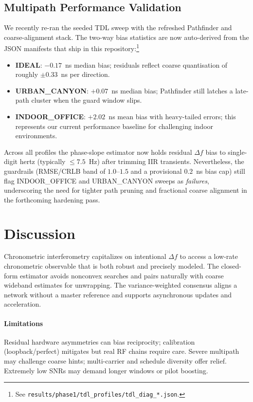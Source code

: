 \documentclass[10pt]{article}
\begin{document}
\subsection{Multipath Performance Validation}
We recently re-ran the seeded TDL sweep with the refreshed Pathfinder and coarse-alignment stack. The two-way bias statistics are now auto-derived from the JSON manifests that ship in this repository:\footnote{See \texttt{results/phase1/tdl\_profiles/tdl\_diag\_*.json}.}

\begin{itemize}[leftmargin=*]
  \item \textbf{IDEAL}: $-0.17$~ns median bias; residuals reflect coarse quantisation of roughly $\pm 0.33$~ns per direction.
  \item \textbf{URBAN\_CANYON}: $+0.07$~ns median bias; Pathfinder still latches a late-path cluster when the guard window slips.
  \item \textbf{INDOOR\_OFFICE}: $+2.02$~ns mean bias with heavy-tailed errors; this represents our current performance baseline for challenging indoor environments.
\end{itemize}

Across all profiles the phase-slope estimator now holds residual $\Delta f$ bias to single-digit hertz (typically $\leq 7.5$~Hz) after trimming IIR transients. Nevertheless, the guardrails (RMSE/CRLB band of $1.0$--$1.5$ and a provisional $0.2$~ns bias cap) still flag INDOOR\_OFFICE and URBAN\_CANYON sweeps as \emph{failures}, underscoring the need for tighter path pruning and fractional coarse alignment in the forthcoming hardening pass.

\section{Discussion}
Chronometric interferometry capitalizes on intentional $\Delta f$ to access a low-rate chronometric observable that is both robust and precisely modeled. The closed-form estimator avoids nonconvex searches and pairs naturally with coarse wideband estimates for unwrapping. The variance-weighted consensus aligns a network without a master reference and supports asynchronous updates and acceleration.

\paragraph{Limitations}
Residual hardware asymmetries can bias reciprocity; calibration (loopback/perfect) mitigates but real RF chains require care. Severe multipath may challenge coarse hints; multi-carrier and schedule diversity offer relief. Extremely low SNRs may demand longer windows or pilot boosting.
\end{document}
